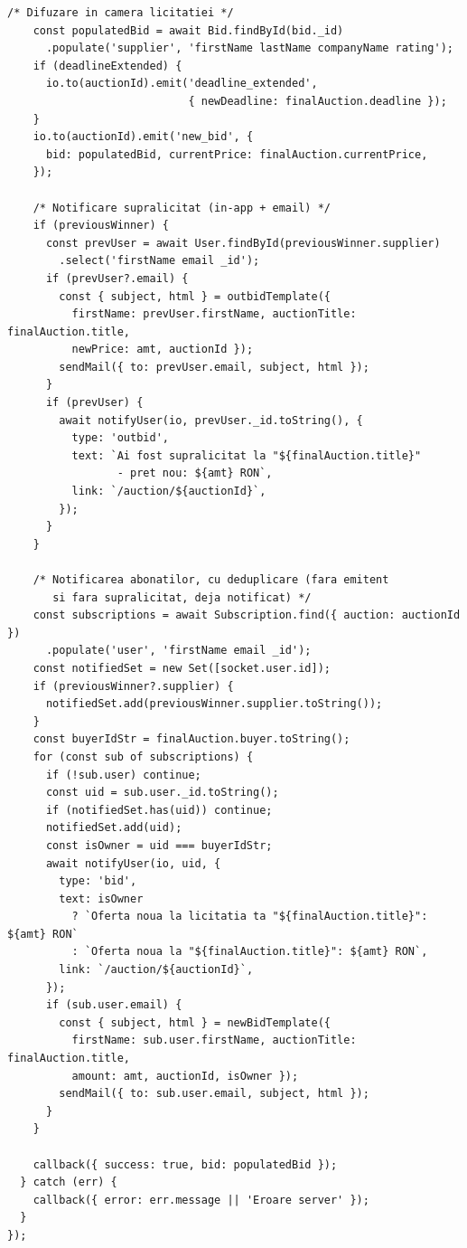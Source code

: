 \begin{appendices}
\begin{lstlisting}[caption={Handler-ul place\_bid (server/sockets/bidSocket.js, fără jurnalizare)},label={lst:place-bid-full}]
    /* Difuzare in camera licitatiei */
    const populatedBid = await Bid.findById(bid._id)
      .populate('supplier', 'firstName lastName companyName rating');
    if (deadlineExtended) {
      io.to(auctionId).emit('deadline_extended',
                            { newDeadline: finalAuction.deadline });
    }
    io.to(auctionId).emit('new_bid', {
      bid: populatedBid, currentPrice: finalAuction.currentPrice,
    });

    /* Notificare supralicitat (in-app + email) */
    if (previousWinner) {
      const prevUser = await User.findById(previousWinner.supplier)
        .select('firstName email _id');
      if (prevUser?.email) {
        const { subject, html } = outbidTemplate({
          firstName: prevUser.firstName, auctionTitle: finalAuction.title,
          newPrice: amt, auctionId });
        sendMail({ to: prevUser.email, subject, html });
      }
      if (prevUser) {
        await notifyUser(io, prevUser._id.toString(), {
          type: 'outbid',
          text: `Ai fost supralicitat la "${finalAuction.title}"
                 - pret nou: ${amt} RON`,
          link: `/auction/${auctionId}`,
        });
      }
    }

    /* Notificarea abonatilor, cu deduplicare (fara emitent
       si fara supralicitat, deja notificat) */
    const subscriptions = await Subscription.find({ auction: auctionId })
      .populate('user', 'firstName email _id');
    const notifiedSet = new Set([socket.user.id]);
    if (previousWinner?.supplier) {
      notifiedSet.add(previousWinner.supplier.toString());
    }
    const buyerIdStr = finalAuction.buyer.toString();
    for (const sub of subscriptions) {
      if (!sub.user) continue;
      const uid = sub.user._id.toString();
      if (notifiedSet.has(uid)) continue;
      notifiedSet.add(uid);
      const isOwner = uid === buyerIdStr;
      await notifyUser(io, uid, {
        type: 'bid',
        text: isOwner
          ? `Oferta noua la licitatia ta "${finalAuction.title}": ${amt} RON`
          : `Oferta noua la "${finalAuction.title}": ${amt} RON`,
        link: `/auction/${auctionId}`,
      });
      if (sub.user.email) {
        const { subject, html } = newBidTemplate({
          firstName: sub.user.firstName, auctionTitle: finalAuction.title,
          amount: amt, auctionId, isOwner });
        sendMail({ to: sub.user.email, subject, html });
      }
    }

    callback({ success: true, bid: populatedBid });
  } catch (err) {
    callback({ error: err.message || 'Eroare server' });
  }
});
\end{lstlisting}


\end{appendices}
